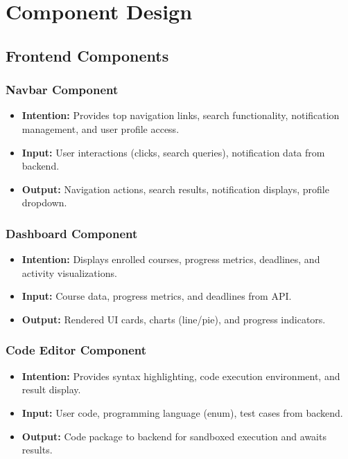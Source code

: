\documentclass[a4paper, 11pt]{scrreprt}
\begin{document}
\chapter{Component Design}

\section{Frontend Components}

\subsection{Navbar Component}
\begin{itemize}
    \item \textbf{Intention:} Provides top navigation links, search functionality, notification management, and user profile access.
    \item \textbf{Input:} User interactions (clicks, search queries), notification data from backend.
    \item \textbf{Output:} Navigation actions, search results, notification displays, profile dropdown.
\end{itemize}

\subsection{Dashboard Component}
\begin{itemize}
    \item \textbf{Intention:} Displays enrolled courses, progress metrics, deadlines, and activity visualizations.
    \item \textbf{Input:} Course data, progress metrics, and deadlines from API.
    \item \textbf{Output:} Rendered UI cards, charts (line/pie), and progress indicators.
\end{itemize}

\subsection{Code Editor Component}
\begin{itemize}
    \item \textbf{Intention:} Provides syntax highlighting, code execution environment, and result display.
    \item \textbf{Input:} User code, programming language (enum), test cases from backend.
    \item \textbf{Output:} Code package to backend for sandboxed execution and awaits results.
\end{itemize}
\end{document}
